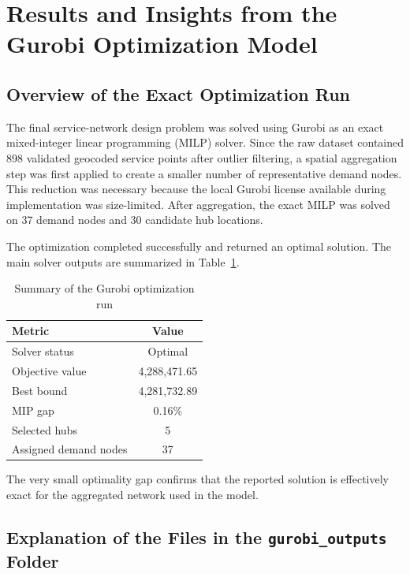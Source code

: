 \section{Results and Insights from the Gurobi Optimization Model}

\subsection{Overview of the Exact Optimization Run}

The final service-network design problem was solved using Gurobi as an exact mixed-integer linear programming (MILP) solver. Since the raw dataset contained 898 validated geocoded service points after outlier filtering, a spatial aggregation step was first applied to create a smaller number of representative demand nodes. This reduction was necessary because the local Gurobi license available during implementation was size-limited. After aggregation, the exact MILP was solved on 37 demand nodes and 30 candidate hub locations.

The optimization completed successfully and returned an optimal solution. The main solver outputs are summarized in Table~\ref{tab:gurobi_solver_summary}.

\begin{table}[h!]
\centering
\caption{Summary of the Gurobi optimization run}
\label{tab:gurobi_solver_summary}
\begin{tabular}{|l|c|}
\hline
\textbf{Metric} & \textbf{Value} \\
\hline
Solver status & Optimal \\
Objective value & 4,288,471.65 \\
Best bound & 4,281,732.89 \\
MIP gap & 0.16\% \\
Selected hubs & 5 \\
Assigned demand nodes & 37 \\
\hline
\end{tabular}
\end{table}

The very small optimality gap confirms that the reported solution is effectively exact for the aggregated network used in the model.

\subsection{Explanation of the Files in the \texttt{gurobi\_outputs} Folder}

